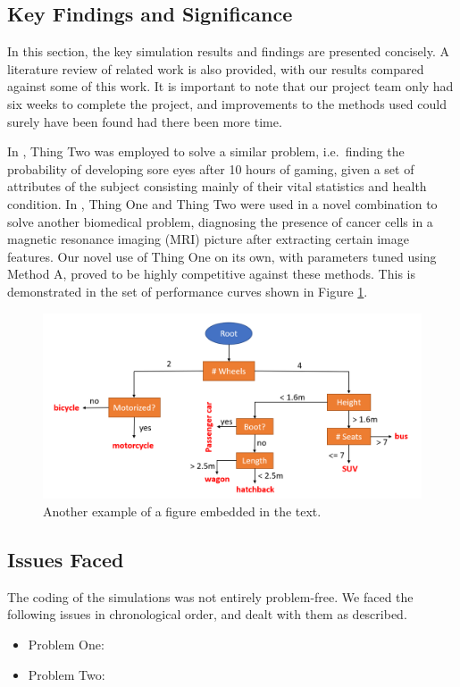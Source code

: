 \documentclass[12pt,a4paper]{article}
\begin{document}
	\subsection{Key Findings and Significance}
	In this section, the key simulation results and findings are presented concisely. A literature review of related work is also provided, with our results compared against some of this work. It is important to note that our project team only had six weeks to complete the project, and improvements to the methods used could surely have been found had there been more time.
	
	In \cite{einstein}, Thing Two was employed to solve a similar problem, i.e.\ finding the probability of developing sore eyes after 10 hours of gaming, given a set of attributes of the subject consisting mainly of their vital statistics and health condition. In \cite{knuthwebsite}, Thing One and Thing Two were used in a novel combination to solve another biomedical problem, diagnosing the presence of cancer cells in a magnetic resonance imaging (MRI) picture after extracting certain image features. Our novel use of Thing One on its own, with parameters tuned using Method A, proved to be highly competitive against these methods. This is demonstrated in the set of performance curves shown in Figure \ref{fig:two}.
	
	\begin{figure}
	\begin{center}
		\includegraphics[width=0.8\linewidth]{Dec-Tree.png}
	\end{center}
	\caption{Another example of a figure embedded in the text.}
	\label{fig:two}
	\end{figure}	

	\subsection{Issues Faced} \label{sec:issue}
	The coding of the simulations was not entirely problem-free. We faced the following issues in chronological order, and dealt with them as described.
	\begin{itemize}
		\item Problem One:
		\item Problem Two:
	\end{itemize}
\end{document}
